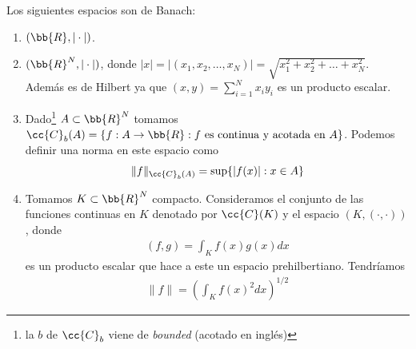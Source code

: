 \begin{ejemplo}Los siguientes espacios son de Banach:\\
    \begin{enumerate}
        \item $(\bb{R}, |\cdot|)$.
        \item $(\bb{R}^N, |\cdot|)$, donde $|x| = |(x_1, x_2, \dots, x_N)| = \sqrt{x_1^2 + x_2^2 + \dots + x_N^2}$. Además es de Hilbert ya que $(x,y) = \sum_{i=1}^N x_i y_i$ es un producto escalar.
        \item  Dado\footnote{la $b$ de $\cc{C}_b$ viene de \textit{bounded} (acotado en inglés)} $A\subset \bb{R}^N$ tomamos $\cc{C}_b(A) = \{f: A \to \bb{R} : f \text{ es continua y acotada en } A \}$. Podemos definir una norma en este espacio como 
        \begin{align*}
            \|f\|_{\cc{C}_b(A)} = \sup\{|f(x)| : x\in A\}
        \end{align*}

        \item Tomamos $K\subset \bb{R}^N$ compacto. Consideramos el conjunto de las funciones continuas en $K$ denotado por $\cc{C}(K)$ y el espacio $(K, (\cdot,\cdot))$, donde 
        \begin{gather*}
            (f,g) = \int_K f(x)g(x) dx
        \end{gather*}
        es un producto escalar que hace a este un espacio prehilbertiano. Tendríamos 
        \begin{gather*}
            \|f\| = \left(\displaystyle\int_K f(x)^2 dx\right)^{1/2}
        \end{gather*}
    \end{enumerate}
\end{ejemplo}

